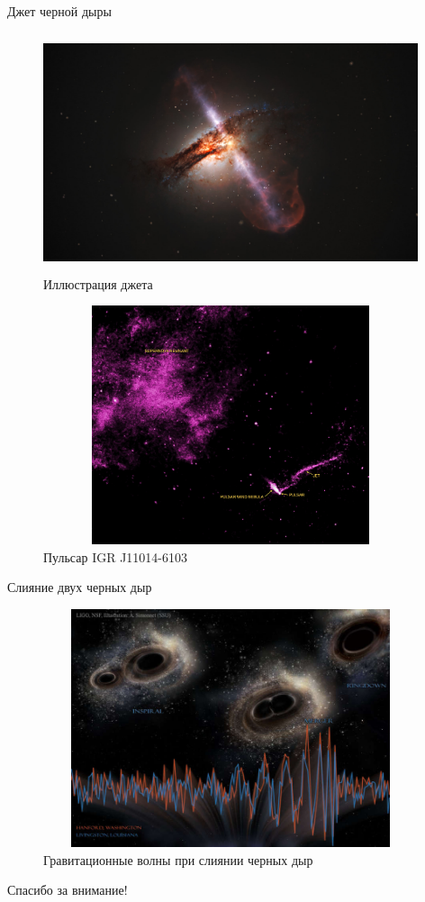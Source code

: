 \documentclass[
]{beamer}
\begin{document}
\begin{frame}{Джет черной дыры}
	\begin{figure}[H]
		\centering
		\includegraphics[width=11cm, height=7cm]{image_8308_1e-TXS-2116-077.jpg}
		\caption{Иллюстрация джета}
	\end{figure}
\end{frame}
\begin{frame}{}
	\begin{figure}[H]
		\centering
		\includegraphics[width=11cm, height=7cm]{Lighthouse_nebula.jpg}
		\caption{Пульсар IGR J11014-6103}
	\end{figure}
\end{frame}
\begin{frame}{Слияние двух черных дыр}
	\begin{figure}[H]
		\centering
		\includegraphics[width=11cm, height=7cm]{bhmerger_ligo_960.small.jpg}
		\caption{Гравитационные волны при слиянии черных дыр}
	\end{figure}
\end{frame}
\begin{frame}
\begin{center}
	Спасибо за внимание!
\end{center}
\end{frame}
\end{document}

